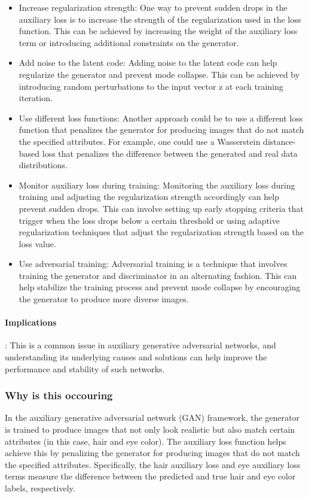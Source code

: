 \documentclass{article}
\theoremstyle{mytheoremstyle}
\theoremstyle{mytheoremstyle}
\theoremstyle{myproblemstyle}
\begin{document}
    \begin{itemize}
      \item Increase regularization strength: One way to prevent sudden drops in the auxiliary loss is to increase the strength of the regularization used in the loss function. This can be achieved by increasing the weight of the auxiliary loss term or introducing additional constraints on the generator.
      \item Add noise to the latent code: Adding noise to the latent code can help regularize the generator and prevent mode collapse. This can be achieved by introducing random perturbations to the input vector z at each training iteration.
      \item Use different loss functions: Another approach could be to use a different loss function that penalizes the generator for producing images that do not match the specified attributes. For example, one could use a Wasserstein distance-based loss that penalizes the difference between the generated and real data distributions.
      \item Monitor auxiliary loss during training: Monitoring the auxiliary loss during training and adjusting the regularization strength accordingly can help prevent sudden drops. This can involve setting up early stopping criteria that trigger when the loss drops below a certain threshold or using adaptive regularization techniques that adjust the regularization strength based on the loss value.
      \item Use adversarial training: Adversarial training is a technique that involves training the generator and discriminator in an alternating fashion. This can help stabilize the training process and prevent mode collapse by encouraging the generator to produce more diverse images.
    \end{itemize}

    \paragraph{Implications}: This is a common issue in auxiliary generative adversarial networks, and understanding its underlying causes and solutions can help improve the performance and stability of such networks.

    \subsubsection{Why is this occouring}
In the auxiliary generative adversarial network (GAN) framework, the generator is trained to produce images that not only look realistic but also match certain attributes (in this case, hair and eye color). The auxiliary loss function helps achieve this by penalizing the generator for producing images that do not match the specified attributes. Specifically, the hair auxiliary loss and eye auxiliary loss terms measure the difference between the predicted and true hair and eye color labels, respectively.
\end{document}

